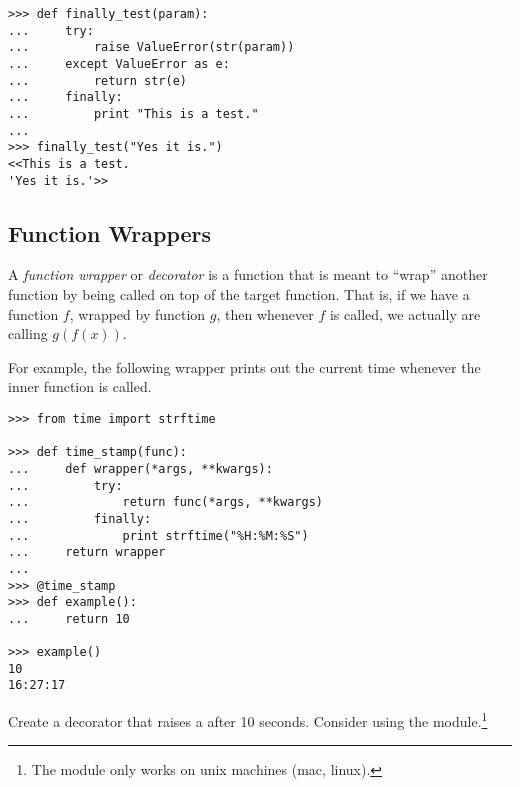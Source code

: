 \begin{lstlisting}
>>> def finally_test(param):
...     try:
...         raise ValueError(str(param))
...     except ValueError as e:
...         return str(e)
...     finally:
...         print "This is a test."
...
>>> finally_test("Yes it is.")
<<This is a test.
'Yes it is.'>>
\end{lstlisting}

\subsection*{Function Wrappers} %

A \emph{function wrapper} or \emph{decorator} is a function that is meant to ``wrap'' another function by being called on top of the target function.
That is, if we have a function $f$, wrapped by function $g$, then whenever $f$ is called, we actually are calling $g(f(x))$.

For example, the following wrapper prints out the current time whenever the inner function is called.

\begin{lstlisting}
>>> from time import strftime

>>> def time_stamp(func):
...     def wrapper(*args, **kwargs):
...         try:
...             return func(*args, **kwargs)
...         finally:
...             print strftime("%H:%M:%S")
...     return wrapper
...
>>> @time_stamp
>>> def example():
...     return 10

>>> example()
10
16:27:17
\end{lstlisting}

Create a decorator that raises a  after 10 seconds.
Consider using the  module.\footnote{The  module only works on unix machines (mac, linux).}
